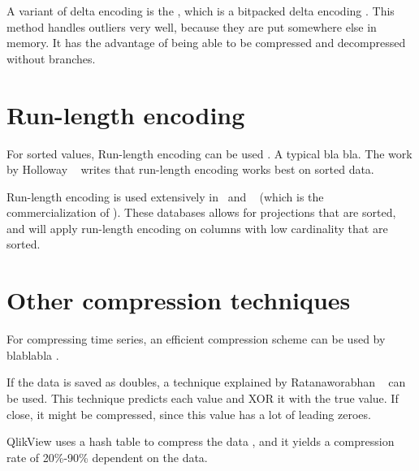 A variant of delta encoding is the , which is a bitpacked delta encoding \cite{Bjorklund2011-wh}. This method handles outliers very well, because they are put somewhere else in memory. It has the advantage of being able to be compressed and decompressed without branches.

\section{Run-length encoding}
\label{sec:Run-length encoding}
For sorted values, Run-length encoding can be used \cite{Bjorklund2011-wh}. A typical bla bla. The work by Holloway \ea~\cite{Holloway2008-rr} writes that run-length encoding works best on sorted data.

Run-length encoding is used extensively in \cstore~and \vertica~\cite{Barber2012-xt} (which is the commercialization of \cstore). These databases allows for projections that are sorted, and will apply run-length encoding on columns with low cardinality that are sorted.
\section{Other compression techniques}
\label{sec:Other compression techniques}
For compressing time series, an efficient compression scheme can be used by blablabla \cite{Pelkonen2015-ko}.

If the data is saved as doubles, a technique explained by Ratanaworabhan \ea~\cite{Ratanaworabhan2006-jb} can be used. This technique predicts each value and XOR it with the true value. If close, it might be compressed, since this value has a lot of leading zeroes.

QlikView uses a hash table to compress the data \cite{Qlik2014-vd}, and it yields a compression rate of 20\%-90\% dependent on the data.
